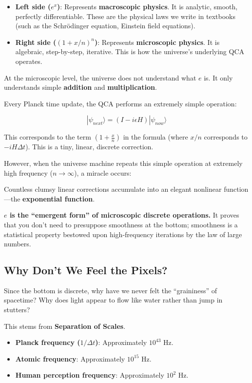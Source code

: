 \begin{itemize}
\item \textbf{Left side ($e^x$)}: Represents \textbf{macroscopic physics}. It is analytic, smooth, perfectly differentiable. These are the physical laws we write in textbooks (such as the Schrödinger equation, Einstein field equations).

\item \textbf{Right side ($(1 + x/n)^n$)}: Represents \textbf{microscopic physics}. It is algebraic, step-by-step, iterative. This is how the universe's underlying QCA operates.
\end{itemize}

At the microscopic level, the universe does not understand what $e$ is. It only understands simple \textbf{addition} and \textbf{multiplication}.

Every Planck time update, the QCA performs an extremely simple operation:

$$|\psi_{next}\rangle = (I - i \epsilon H) |\psi_{now}\rangle$$

This corresponds to the term $(1 + \frac{x}{n})$ in the formula (where $x/n$ corresponds to $-iH\Delta t$). This is a tiny, linear, discrete correction.

However, when the universe machine repeats this simple operation at extremely high frequency ($n \to \infty$), a miracle occurs:

Countless clumsy linear corrections accumulate into an elegant nonlinear function---the \textbf{exponential function}.

\textbf{$e$ is the ``emergent form'' of microscopic discrete operations.} It proves that you don't need to presuppose smoothness at the bottom; smoothness is a statistical property bestowed upon high-frequency iterations by the law of large numbers.

\subsection{Why Don't We Feel the Pixels?}

Since the bottom is discrete, why have we never felt the ``graininess'' of spacetime? Why does light appear to flow like water rather than jump in stutters?

This stems from \textbf{Separation of Scales}.

\begin{itemize}
\item \textbf{Planck frequency ($1/\Delta t$)}: Approximately $10^{43}$ Hz.

\item \textbf{Atomic frequency}: Approximately $10^{15}$ Hz.

\item \textbf{Human perception frequency}: Approximately $10^{2}$ Hz.
\end{itemize}

